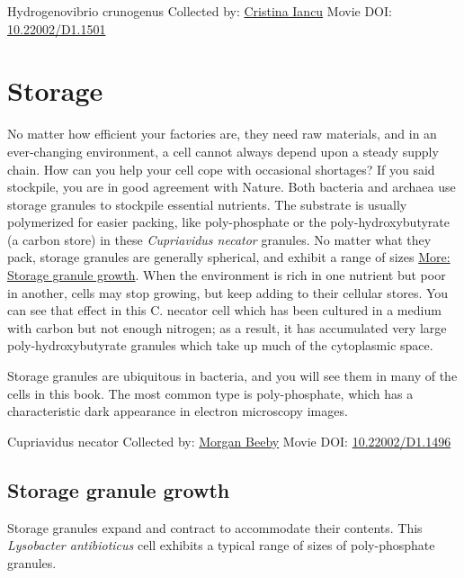 \documentclass[]{tufte-book}
\begin{document}
\label{fig:4-7b}Hydrogenovibrio crunogenus Collected by: \protect\hyperlink{cristina_iancu}{Cristina Iancu} Movie DOI: \href{https://doi.org/10.22002/D1.1501}{10.22002/D1.1501}

\hypertarget{storage}{%
\section{Storage}\label{storage}}

No matter how efficient your factories are, they need raw materials, and in an ever-changing environment, a cell cannot always depend upon a steady supply chain. How can you help your cell cope with occasional shortages? If you said stockpile, you are in good agreement with Nature. Both bacteria and archaea use storage granules to stockpile essential nutrients. The substrate is usually polymerized for easier packing, like poly-phosphate or the poly-hydroxybutyrate (a carbon store) in these \emph{Cupriavidus necator} granules. No matter what they pack, storage granules are generally spherical, and exhibit a range of sizes \protect\hyperlink{Storage_granule_growth}{More: Storage granule growth}. When the environment is rich in one nutrient but poor in another, cells may stop growing, but keep adding to their cellular stores. You can see that effect in this C. necator cell which has been cultured in a medium with carbon but not enough nitrogen; as a result, it has accumulated very large poly-hydroxybutyrate granules which take up much of the cytoplasmic space.

Storage granules are ubiquitous in bacteria, and you will see them in many of the cells in this book. The most common type is poly-phosphate, which has a characteristic dark appearance in electron microscopy images.



\hypertarget{htmlwidget-e117a443b952dd47306b}{}

\label{fig:4-8}Cupriavidus necator Collected by: \protect\hyperlink{morgan_beeby}{Morgan Beeby} Movie DOI: \href{https://doi.org/10.22002/D1.1496}{10.22002/D1.1496}

\hypertarget{Storage_granule_growth}{%
\subsection{Storage granule growth}\label{Storage_granule_growth}}

Storage granules expand and contract to accommodate their contents. This \emph{Lysobacter antibioticus} cell exhibits a typical range of sizes of poly-phosphate granules.
\end{document}
